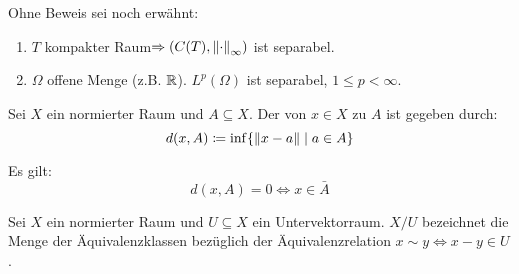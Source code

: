 \begin{bemerkung*}
	Ohne Beweis sei noch erw\"ahnt:
	\begin{enumerate}
		\item $ T $ kompakter Raum$ \Rightarrow(C(T),\left\|\cdot\right\|_\infty) $ ist separabel.
		\item $ \Omega $ offene Menge (z.B. $ \mathbb{R} $). $ L^p(\Omega) $ ist separabel, $ 1\leq p<\infty $.
	\end{enumerate}
\end{bemerkung*}
\begin{definition}
	Sei $ X $ ein normierter Raum und $ A\subseteq X $. Der   von $ x\in X $ zu $ A $ ist gegeben durch:
	\[ d(x,A)\coloneqq\inf\lbrace\left\|x-a\right\|\mid a\in A\rbrace \]
\end{definition}
\begin{bemerkung*}
 Es gilt: \[ d(x,A)=0\Leftrightarrow x\in\bar A \]
\end{bemerkung*}
\begin{satz}
	Sei $ X $ ein normierter Raum und $ U\subseteq X $ ein Untervektorraum. $ X/U $ bezeichnet die Menge der \"Aquivalenzklassen bez\"uglich der \"Aquivalenzrelation $ x\sim y\Leftrightarrow x-y\in U $.
\end{satz}